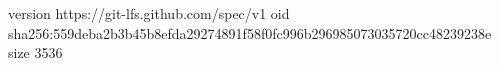 version https://git-lfs.github.com/spec/v1
oid sha256:559deba2b3b45b8efda29274891f58f0fc996b296985073035720cc48239238e
size 3536
